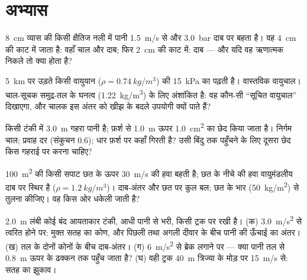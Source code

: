 \section{अभ्यास}

\begin{exercise}[$\star$]\label{exo:b2:euler-bernoulli:1}
\qty{8}{cm} व्यास की किसी क्षैतिज नली में पानी \qty{1.5}{m/s} से और
\qty{3.0}{bar} दाब पर बहता है। वह \qty{4}{cm} की काट में जाता है: वहाँ चाल
और दाब; फिर \qty{2}{cm} की काट में: दाब --- और यदि वह ऋणात्मक निकले तो
क्या होता है?
\end{exercise}

\begin{exercise}[$\star$]\label{exo:b2:euler-bernoulli:2}
\qty{5}{km} पर उड़ते किसी वायुयान ($\rho = \qty{0.74}{kg/m^3}$) की 
\qty{15}{kPa} का  पढ़ती है। वास्तविक वायुचाल। चाल-सूचक
समुद्र-तल के घनत्व (\qty{1.22}{kg/m^3}) के लिए अंशांकित है: वह कौन-सी
``सूचित वायुचाल'' दिखाएगा, और चालक इस
अंतर को खीझ के बदले उपयोगी क्यों पाते हैं?
\end{exercise}

\begin{exercise}[$\star$]\label{exo:b2:euler-bernoulli:3}
किसी टंकी में \qty{3.0}{m} गहरा पानी है; फ़र्श से \qty{1.0}{m} ऊपर
\qty{1.0}{cm^2} का छेद किया जाता है। निर्गम चाल; प्रवाह दर (संकुचन $0.6$);
धार फ़र्श पर कहाँ गिरती है? उसी बिंदु तक पहुँचने के लिए दूसरा छेद किस
गहराई पर करना चाहिए?
\end{exercise}

\begin{exercise}[$\star$]\label{exo:b2:euler-bernoulli:4}
\qty{100}{m^2} की किसी सपाट छत के ऊपर \qty{30}{m/s} की हवा बहती है; छत के
नीचे की हवा वायुमंडलीय दाब पर स्थिर है ($\rho = \qty{1.2}{kg/m^3}$)।
दाब-अंतर और छत पर कुल बल; छत के भार (\qty{50}{kg/m^2}) से
तुलना कीजिए। वह किस ओर धकेली जाती है?
\end{exercise}

\begin{exercise}[$\star\star$]\label{exo:b2:euler-bernoulli:5}
\qty{2.0}{m} लंबी कोई बंद आयताकार टंकी, आधी पानी से भरी, किसी
ट्रक पर रखी है। (क) \qty{3.0}{m/s^2} से त्वरित होने पर: मुक्त सतह का कोण,
और पिछली तथा अगली दीवार के बीच पानी की ऊँचाई का
अंतर। (ख) तल के दोनों कोनों के बीच दाब-अंतर। (ग)
\qty{6}{m/s^2} से ब्रेक लगाने पर --- क्या पानी तल से \qty{0.8}{m} ऊपर के ढक्कन
तक पहुँच जाता है? (घ) वही ट्रक \qty{40}{m} त्रिज्या के मोड़ पर
\qty{15}{m/s} से: सतह का झुकाव।
\end{exercise}

